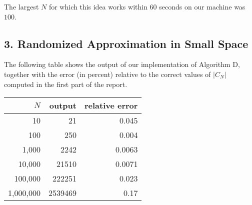 \documentclass{tufte-handout}
\begin{document}
The largest $N$ for which this idea works within 60 seconds on our
machine was $100$.


\subsection{3. Randomized Approximation in Small Space}

The following table shows the output of our implementation of
Algorithm D, together with the error (in percent) relative to the
correct values of $|C_N|$ computed in the first part of the report.

\medskip
\begin{tabular}{rrr}
  \toprule
  $N$ &   output & relative error \\
  \midrule
  10 & 21 & 0.045 \\
  100 & 250 & 0.004 \\
  1,000 & 2242 & 0.0063 \\
  10,000 & 21510 & 0.0071 \\
  100,000 & 222251 & 0.023 \\
  1,000,000 & 2539469 & 0.17 \\
  \bottomrule
\end{tabular}
\end{document}
